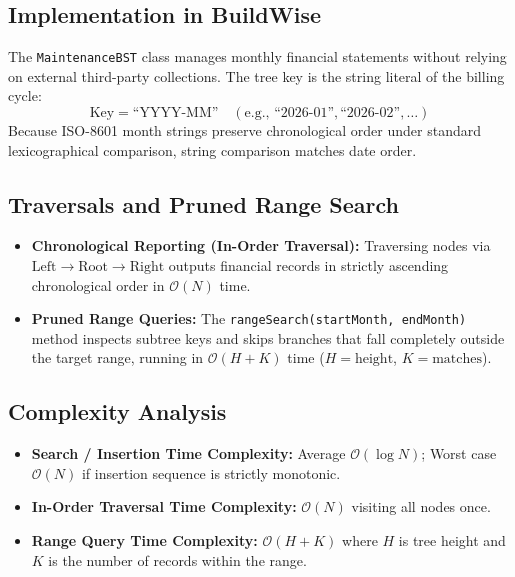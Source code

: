 \documentclass[12pt,a4paper]{article}
\begin{document}
\subsection{Implementation in BuildWise}
The \texttt{MaintenanceBST} class manages monthly financial statements without relying on external third-party collections. The tree key is the string literal of the billing cycle:
\begin{equation}
    \text{Key} = \text{``YYYY-MM''} \quad (\text{e.g., ``2026-01''}, \text{``2026-02''}, \dots)
\end{equation}
Because ISO-8601 month strings preserve chronological order under standard lexicographical comparison, string comparison matches date order.

\subsection{Traversals and Pruned Range Search}
\begin{itemize}[leftmargin=1.5em]
    \item \textbf{Chronological Reporting (In-Order Traversal):} Traversing nodes via $\text{Left} \to \text{Root} \to \text{Right}$ outputs financial records in strictly ascending chronological order in $\mathcal{O}(N)$ time.
    \item \textbf{Pruned Range Queries:} The \texttt{rangeSearch(startMonth, endMonth)} method inspects subtree keys and skips branches that fall completely outside the target range, running in $\mathcal{O}(H + K)$ time ($H = \text{height}$, $K = \text{matches}$).
\end{itemize}

\subsection{Complexity Analysis}
\begin{itemize}[leftmargin=1.5em]
    \item \textbf{Search / Insertion Time Complexity:} Average $\mathcal{O}(\log N)$; Worst case $\mathcal{O}(N)$ if insertion sequence is strictly monotonic.
    \item \textbf{In-Order Traversal Time Complexity:} $\mathcal{O}(N)$ visiting all nodes once.
    \item \textbf{Range Query Time Complexity:} $\mathcal{O}(H + K)$ where $H$ is tree height and $K$ is the number of records within the range.
\end{itemize}
\end{document}
